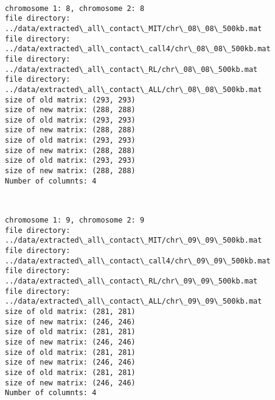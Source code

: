 \documentclass[11pt]{article}
\begin{document}
    \begin{center}
    \end{center}
    { \hspace*{\fill} \\}
    
    \begin{Verbatim}[commandchars=\\\{\}]
chromosome 1: 8, chromosome 2: 8
file directory: ../data/extracted\_all\_contact\_MIT/chr\_08\_08\_500kb.mat
file directory: ../data/extracted\_all\_contact\_call4/chr\_08\_08\_500kb.mat
file directory: ../data/extracted\_all\_contact\_RL/chr\_08\_08\_500kb.mat
file directory: ../data/extracted\_all\_contact\_ALL/chr\_08\_08\_500kb.mat
size of old matrix: (293, 293)
size of new matrix: (288, 288)
size of old matrix: (293, 293)
size of new matrix: (288, 288)
size of old matrix: (293, 293)
size of new matrix: (288, 288)
size of old matrix: (293, 293)
size of new matrix: (288, 288)
Number of columnts: 4

    \end{Verbatim}

    \begin{center}
    \end{center}
    { \hspace*{\fill} \\}
    
    \begin{Verbatim}[commandchars=\\\{\}]
chromosome 1: 9, chromosome 2: 9
file directory: ../data/extracted\_all\_contact\_MIT/chr\_09\_09\_500kb.mat
file directory: ../data/extracted\_all\_contact\_call4/chr\_09\_09\_500kb.mat
file directory: ../data/extracted\_all\_contact\_RL/chr\_09\_09\_500kb.mat
file directory: ../data/extracted\_all\_contact\_ALL/chr\_09\_09\_500kb.mat
size of old matrix: (281, 281)
size of new matrix: (246, 246)
size of old matrix: (281, 281)
size of new matrix: (246, 246)
size of old matrix: (281, 281)
size of new matrix: (246, 246)
size of old matrix: (281, 281)
size of new matrix: (246, 246)
Number of columnts: 4

    \end{Verbatim}

    \begin{center}
    \end{center}
    { \hspace*{\fill} \\}
    
\end{document}
